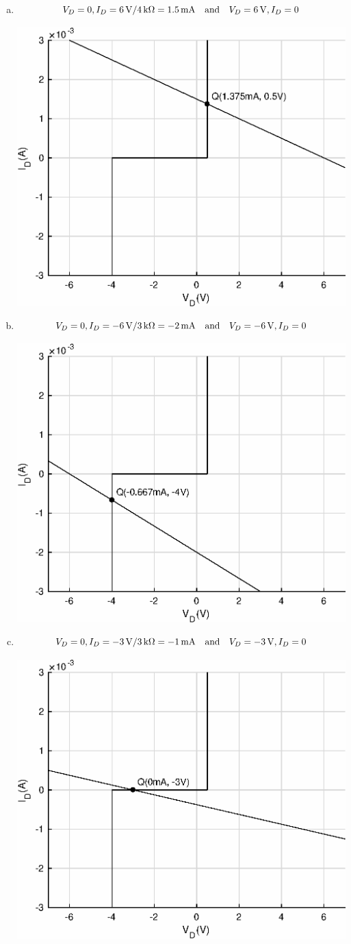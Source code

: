 \documentclass{article}
\newcommand{\unit}[1]{{\rm\,#1}}
\begin{document}
\section{}
\begin{enumerate}[(a)]
\item
$$V_D=0,I_D=6\unit{V}/4\unit{k\Omega}=1.5\unit{mA}{\rm\quad and\quad}V_D=6\unit{V},I_D=0$$
\begin{center}
\includegraphics[width=0.5\linewidth]{matlab/iv-4.eps}
\end{center}
\item
$$V_D=0,I_D=-6\unit{V}/3\unit{k\Omega}=-2\unit{mA}{\rm\quad and\quad}V_D=-6\unit{V},I_D=0$$
\begin{center}
\includegraphics[width=0.5\linewidth]{matlab/iv-5.eps}
\end{center}
\item
$$V_D=0,I_D=-3\unit{V}/3\unit{k\Omega}=-1\unit{mA}{\rm\quad and\quad}V_D=-3\unit{V},I_D=0$$
\begin{center}
\includegraphics[width=0.5\linewidth]{matlab/iv-6.eps}

\end{center}
\end{enumerate}
\end{document}
